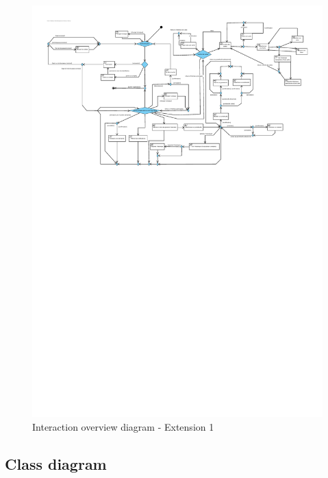 \documentclass[]{report}
\begin{document}
\begin{figure}[h]
	\centering\includegraphics[width=\linewidth]{img/iov-client-Extension-1.pdf}
	\caption{Interaction overview diagram - Extension 1}
\end{figure}



\newpage

\subsection{Class diagram}
\end{document}

